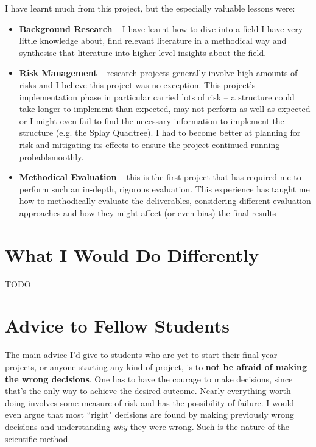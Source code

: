 I have learnt much from this project, but the especially valuable lessons were:
\begin{itemize}
	\item \textbf{Background Research} -- I have learnt how to dive into a field I have very little knowledge about, find relevant literature in a methodical way and synthesise that literature into higher-level insights about the field.
	\item \textbf{Risk Management} -- research projects generally involve high amounts of risks and I believe this project was no exception. This project's implementation phase in particular carried lots of risk -- a structure could take longer to implement than expected, may not perform as well as expected or I might even fail to find the necessary information to implement the structure (e.g. the Splay Quadtree). I had to become better at planning for risk and mitigating its effects to ensure the project continued running  probablsmoothly.
	\item \textbf{Methodical Evaluation} -- this is the first project that has required me to perform such an in-depth, rigorous evaluation. This experience has taught me how to methodically evaluate the deliverables, considering different evaluation approaches and how they might affect (or even bias) the final results
\end{itemize}

\section{What I Would Do Differently}

TODO

\section{Advice to Fellow Students}

The main advice I'd give to students who are yet to start their final year projects, or anyone starting any kind of project, is to \textbf{not be afraid of making the wrong decisions}. One has to have the courage to make decisions, since that's the only way to achieve the desired outcome. Nearly everything worth doing involves some measure of risk and has the possibility of failure. I would even argue that most ``right" decisions are found by making previously wrong decisions and understanding \textit{why} they were wrong. Such is the nature of the scientific method.

